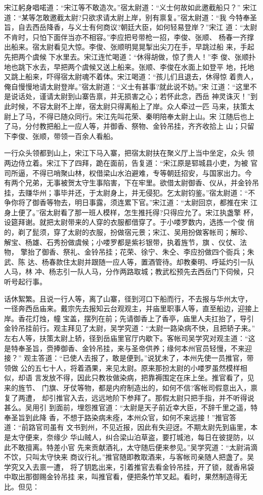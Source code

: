 宋江躬身唱喏道：“宋江等不敢造次。”宿太尉道：“义士何故如此邀截船只？”
宋江道：“某等怎敢邀截太尉?只欲求请太尉上岸，别有禀复。”宿太尉道：“我
今特奉圣旨，自去西岳降香，与义士有何商议?朝廷大臣，如何轻易登岸？”宋江
道：“太尉不肯时，只怕下面伴当亦不相容。”李应把号带枪一招，李俊、张顺、
杨春一齐撑出船来。宿太尉看见大惊。李俊、张顺明晃晃掣出尖刀在手，早跳过船
来，手起先把两个虞候下水里去。宋江连忙喝道：“休得胡做，惊了贵人！”李
俊、张顺扑地也跳下水去，早把两个虞候又送上船来。张顺、李俊在水面上如登平
地，托地又跳上船来，吓得宿太尉魂不着体。宋江喝道：“孩儿们且退去，休得惊
着贵人，俺自慢慢地请太尉登岸。”宿太尉道：“义士有甚事?就此说不妨。”宋
江道：“这里不是说话处，谨请太尉到山寨告禀，并无损害之心；若怀此念，西岳
神灵诛灭！”到此时候，不容太尉不上岸，宿太尉只得离船上了岸。众人牵过一匹
马来，扶策太尉上了马，不得已随众同行。宋江先叫花荣、秦明陪奉太尉上山。宋
江随后也上了马，分付教把船上一应人等，并御香、祭物、金铃吊挂，齐齐收拾上
山；只留下李俊、张顺，带领一百余人看船。

一行众头领都到山上，宋江下马入寨，把宿太尉扶在聚义厅上当中坐定，众头
领两边侍立着。宋江下了四拜，跪在面前，告复道：“宋江原是郓城县小吏，为被
官司所逼，不得已哨聚山林，权借梁山水泊避难，专等朝廷招安，与国家出力。今
有两个兄弟，无事被贺太守生事陷害，下在牢里。欲借太尉御香、仪从，并金铃吊
挂，去赚华州；事毕并还，于太尉身上，并无侵犯。乞太尉钧鉴。”宿太尉道：“不
争你将了御香等物去，明日事露，须连累下官。”宋江道：“太尉回京，都推在宋
江身上便了。”宿太尉看了那一班人模样，怎生推托得?只得应允了。宋江执盏擎
杯，设筵拜谢。就把太尉带来的人穿的衣服都借穿了。于小喽罗数内，选拣一个俊
俏的，剃了髭须，穿了太尉的衣服，扮做宿元景；宋江、吴用扮做客帐司；解珍、
解宝、杨雄、石秀扮做虞候；小喽罗都是紫衫银带，执着旌节，旗、仪仗、法物，
擎抬了御香、祭礼、金铃吊挂；花荣、徐宁、朱仝、李应扮做四个衙兵；朱武、陈
达、杨春款住太尉并跟随一应人等，置酒管待。却教秦明、呼延灼引一队人马，林
冲、杨志引一队人马，分作两路取城；教武松预先去西岳门下伺候，只听号起行事。

话休絮繁。且说一行人等，离了山寨，径到河口下船而行，不去报与华州太守，
一径奔西岳庙来。戴宗先去报知云台观观主，并庙里职事人等，直至船边，迎接上
岸。香花灯烛，幢宝盖，摆列在前；先请御香上了香亭，庙里人夫扛抬了，导引
金铃吊挂前行。观主拜见了太尉，吴学究道：“太尉一路染病不快，且把轿子来。”
左右人等，扶策太尉上轿，径到岳庙里官厅内歇下。客帐司吴学究对观主道：“这
是特奉圣旨，赍捧御香、金铃吊挂，来与圣帝供养；缘何本州官员轻慢，不来迎接？”
观主答道：“已使人去报了，敢是便到。”说犹未了，本州先使一员推官，带领做
公的五七十人，将着酒果，来见太尉。原来那扮太尉的小喽罗虽然模样相似，却语
言发放不得，因此只教妆做染病，把靠褥围定在床上坐。推官看了，见来的旌节、
门旗、牙仗等物，都是内府制造出的，如何不信?客帐司假意出入，禀复了两遭，
却引推官入去，远远地阶下参拜了。那假太尉只把手指，并不听得说甚么。吴用引
到面前，埋怨推官道：“太尉是天子前近幸大臣，不辞千里之遥，特奉圣旨到此降
香，不想于路染病未痊，本州众官，如何不来远接！”推官答道：“前路官司虽有
文书到州，不见近报，因此有失迎迓。不期太尉先到庙里，本是太守便来，奈缘少
华山贼人，纠合梁山泊草盗，要打城池，每日在彼提防，以此不敢擅离。特差小官
先来贡献酒礼，太守随后便来参见。”吴学究道：“太尉涓滴不饮，只叫太守快来
商议行礼。”推官随即教取酒来，与客帐司亲随人把盏了。吴学究又入去禀一遭，
将了钥匙出来，引着推官去看金铃吊挂，开了锁，就香帛袋中取出那御赐金铃吊挂
来，叫推官看，便把条竹竿叉起。看时，果然制造得无比。但见：


